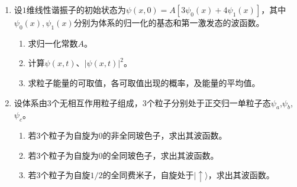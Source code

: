 
\begin{enumerate}
	\item
设$ 1 $维线性谐振子的初始状态为\(\psi(x, 0)=A\left[3 \psi_{0}(x)+4 \psi_{1}(x)\right]\)，其中
	\(\psi_{0}(x), \psi_{1}(x)\)分别为体系的归一化的基态和第一激发态的波函数。
	\begin{enumerate}
		\item
求归一化常数$ A $。
	
	\item 
	计算\(\psi(x, t)\)、\(|\psi(x, t)|^{2}\)。
	
	\item 
	求粒子能量的可取值，各可取值出现的概率，及能量的平均值。
		\end{enumerate}

\banswer{
	
}


\item 
设体系由$ 3 $个无相互作用粒子组成，$ 3 $个粒子分别处于正交归一单粒子态\(\psi_a\),\(\psi_b\),\(\psi_c\)。
\begin{enumerate}
	\item
若$ 3 $个粒子为自旋为$ 0 $的非全同玻色子，求出其波函数。
	
	\item 
	若$ 3 $个粒子为自旋为$ 0 $的全同玻色子，求出其波函数。
	
	\item 
	若$ 3 $个粒子为自旋$ 1/2 $的全同费米子，自旋处于\(|\uparrow\rangle\)，求出其波函数。
\end{enumerate}


\banswer{
	
}



\end{enumerate}
